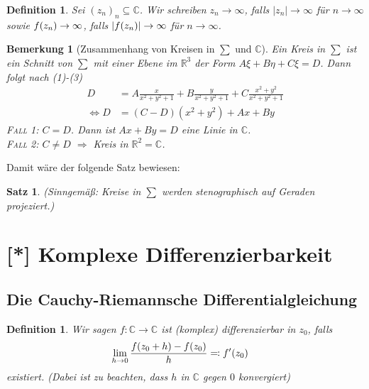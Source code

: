\documentclass[11pt, a4paper]{article}
\theoremstyle{plain}
\newtheorem{bemerkung}[blockelement]{Bemerkung}
\newtheorem{definition}[blockelement]{Definition}
\newtheorem{satz}[blockelement]{Satz}
\numberwithin{equation}{subsection}
\newcommand{\pair}[1]{\left(#1\right)}
\newcommand{\of}[1]{\mathopen{}\mathclose{}\bgroup\left(#1\aftergroup\egroup\right)}
\newcommand{\abs}[1]{\left\lvert#1\right\rvert}
\newcommand{\equivalent}[0]{\Leftrightarrow{}}
\newcommand{\impl}[0]{\Rightarrow{}}
\newcommand{\toinf}{\to\infty}
\newcommand{\R}{\mathbb{R}}
\newcommand{\C}{\mathbb{C}}
\begin{document}
    \begin{definition}
        Sei $(z_n)_n \subseteq \C$. Wir schreiben $z_n \toinf$, falls $\abs{z_n}\toinf$ für $n\toinf$ sowie $f\of{z_n}\toinf$, falls $\abs{f\of{z_n}}\toinf$ für $n\toinf$.
    \end{definition}

    \begin{bemerkung}[Zusammenhang von Kreisen in $\sum$ und $\C$]
        Ein Kreis in $\sum$ ist ein Schnitt von $\sum$ mit einer Ebene im $\R^3$ der Form $A\xi + B\eta + C\xi = D$. Dann folgt nach (1)-(3)
        \begin{align*}
            D &= A \frac{x}{x^2+y^2+1} + B \frac{y}{x^2+y^2+1} + C \frac{x^2+y^2}{x^2+y^2+1}\\
            \equivalent D &= \pair{C - D}\pair{x^2+y^2} + Ax + By
        \end{align*}
        \textsc{Fall 1}: $C = D$. Dann ist $Ax + By = D$ eine Linie in $\C$.\\
        \textsc{Fall 2}: $C \neq D$ $\impl$ Kreis in $\R^2 = \C$.
    \end{bemerkung}
    Damit wäre der folgende Satz bewiesen:
    \begin{satz}
    (\textit{Sinngemäß: Kreise in $\sum$ werden stenographisch auf Geraden projeziert.})
    \end{satz}

    \newpage


    \section{[*] Komplexe Differenzierbarkeit}

    \subsection{Die Cauchy-Riemannsche Differentialgleichung}
    \thispagestyle{sectionpage}

    \begin{definition}
        Wir sagen $f: \C \to \C$ ist (komplex) differenzierbar in $z_0$, falls
        \begin{align*}
            \lim_{h\to 0} \frac{f\of{z_0 + h} - f\of{z_0}}{h} &\eqqcolon f'\of{z_0}
        \end{align*}
        existiert. (Dabei ist zu beachten, dass $h$ in $\C$ gegen $0$ konvergiert)
    \end{definition}
\end{document}
